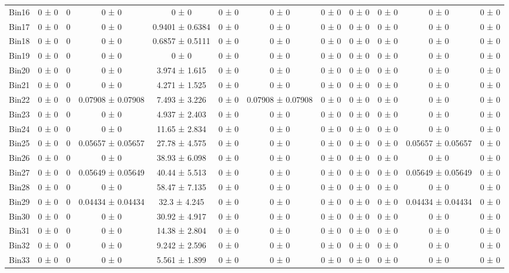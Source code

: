 \begin{tabular}{@{\extracolsep{4pt}}lccccccccccc@{}}
     Bin16 & 0 ± 0 & 0 & 0 ± 0 & 0 ± 0 & 0 ± 0 & 0 ± 0 & 0 ± 0 & 0 ± 0 & 0 ± 0 & 0 ± 0 & 0 ± 0 \\ 
     Bin17 & 0 ± 0 & 0 & 0 ± 0 & 0.9401 ± 0.6384 & 0 ± 0 & 0 ± 0 & 0 ± 0 & 0 ± 0 & 0 ± 0 & 0 ± 0 & 0 ± 0 \\ 
     Bin18 & 0 ± 0 & 0 & 0 ± 0 & 0.6857 ± 0.5111 & 0 ± 0 & 0 ± 0 & 0 ± 0 & 0 ± 0 & 0 ± 0 & 0 ± 0 & 0 ± 0 \\ 
     Bin19 & 0 ± 0 & 0 & 0 ± 0 & 0 ± 0 & 0 ± 0 & 0 ± 0 & 0 ± 0 & 0 ± 0 & 0 ± 0 & 0 ± 0 & 0 ± 0 \\ 
     Bin20 & 0 ± 0 & 0 & 0 ± 0 & 3.974 ± 1.615 & 0 ± 0 & 0 ± 0 & 0 ± 0 & 0 ± 0 & 0 ± 0 & 0 ± 0 & 0 ± 0 \\ 
     Bin21 & 0 ± 0 & 0 & 0 ± 0 & 4.271 ± 1.525 & 0 ± 0 & 0 ± 0 & 0 ± 0 & 0 ± 0 & 0 ± 0 & 0 ± 0 & 0 ± 0 \\ 
     Bin22 & 0 ± 0 & 0 & 0.07908 ± 0.07908 & 7.493 ± 3.226 & 0 ± 0 & 0.07908 ± 0.07908 & 0 ± 0 & 0 ± 0 & 0 ± 0 & 0 ± 0 & 0 ± 0 \\ 
     Bin23 & 0 ± 0 & 0 & 0 ± 0 & 4.937 ± 2.403 & 0 ± 0 & 0 ± 0 & 0 ± 0 & 0 ± 0 & 0 ± 0 & 0 ± 0 & 0 ± 0 \\ 
     Bin24 & 0 ± 0 & 0 & 0 ± 0 & 11.65 ± 2.834 & 0 ± 0 & 0 ± 0 & 0 ± 0 & 0 ± 0 & 0 ± 0 & 0 ± 0 & 0 ± 0 \\ 
     Bin25 & 0 ± 0 & 0 & 0.05657 ± 0.05657 & 27.78 ± 4.575 & 0 ± 0 & 0 ± 0 & 0 ± 0 & 0 ± 0 & 0 ± 0 & 0.05657 ± 0.05657 & 0 ± 0 \\ 
     Bin26 & 0 ± 0 & 0 & 0 ± 0 & 38.93 ± 6.098 & 0 ± 0 & 0 ± 0 & 0 ± 0 & 0 ± 0 & 0 ± 0 & 0 ± 0 & 0 ± 0 \\ 
     Bin27 & 0 ± 0 & 0 & 0.05649 ± 0.05649 & 40.44 ± 5.513 & 0 ± 0 & 0 ± 0 & 0 ± 0 & 0 ± 0 & 0 ± 0 & 0.05649 ± 0.05649 & 0 ± 0 \\ 
     Bin28 & 0 ± 0 & 0 & 0 ± 0 & 58.47 ± 7.135 & 0 ± 0 & 0 ± 0 & 0 ± 0 & 0 ± 0 & 0 ± 0 & 0 ± 0 & 0 ± 0 \\ 
     Bin29 & 0 ± 0 & 0 & 0.04434 ± 0.04434 & 32.3 ± 4.245 & 0 ± 0 & 0 ± 0 & 0 ± 0 & 0 ± 0 & 0 ± 0 & 0.04434 ± 0.04434 & 0 ± 0 \\ 
     Bin30 & 0 ± 0 & 0 & 0 ± 0 & 30.92 ± 4.917 & 0 ± 0 & 0 ± 0 & 0 ± 0 & 0 ± 0 & 0 ± 0 & 0 ± 0 & 0 ± 0 \\ 
     Bin31 & 0 ± 0 & 0 & 0 ± 0 & 14.38 ± 2.804 & 0 ± 0 & 0 ± 0 & 0 ± 0 & 0 ± 0 & 0 ± 0 & 0 ± 0 & 0 ± 0 \\ 
     Bin32 & 0 ± 0 & 0 & 0 ± 0 & 9.242 ± 2.596 & 0 ± 0 & 0 ± 0 & 0 ± 0 & 0 ± 0 & 0 ± 0 & 0 ± 0 & 0 ± 0 \\ 
     Bin33 & 0 ± 0 & 0 & 0 ± 0 & 5.561 ± 1.899 & 0 ± 0 & 0 ± 0 & 0 ± 0 & 0 ± 0 & 0 ± 0 & 0 ± 0 & 0 ± 0 \\ 

\end{tabular}

